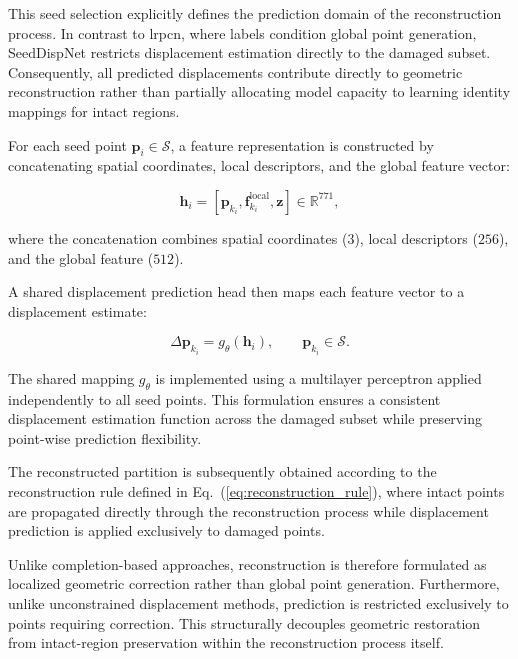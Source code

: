 This seed selection explicitly defines the prediction domain of the reconstruction process. In contrast to \ac{lrpcn}, where labels condition global point generation, SeedDispNet restricts displacement estimation directly to the damaged subset. Consequently, all predicted displacements contribute directly to geometric reconstruction rather than partially allocating model capacity to learning identity mappings for intact regions.

For each seed point $\mathbf{p}_i \in \mathcal{S}$, a feature representation is constructed by concatenating spatial coordinates, local descriptors, and the global feature vector:


\begin{equation}
\mathbf{h}_i =
\left[
\mathbf{p}_{k_i},
\mathbf{f}_{k_i}^{\text{local}},
\mathbf{z}
\right] \in \mathbb{R}^{771},
\end{equation}

\noindent where the concatenation combines spatial coordinates ($3$), local descriptors ($256$), and the global feature ($512$).

A shared displacement prediction head then maps each feature vector to a displacement estimate:

\begin{equation}
\Delta \mathbf{p}_{k_i}
=
g_{\theta}(\mathbf{h}_i),
\qquad
\mathbf{p}_{k_i} \in \mathcal{S}.
\end{equation}

The shared mapping $g_{\theta}$ is implemented using a multilayer perceptron applied independently to all seed points. This formulation ensures a consistent displacement estimation function across the damaged subset while preserving point-wise prediction flexibility.

The reconstructed partition is subsequently obtained according to the reconstruction rule defined in Eq.~(\ref{eq:reconstruction_rule}), where intact points are propagated directly through the reconstruction process while displacement prediction is applied exclusively to damaged points.

Unlike completion-based approaches, reconstruction is therefore formulated as localized geometric correction rather than global point generation. Furthermore, unlike unconstrained displacement methods, prediction is restricted exclusively to points requiring correction. This structurally decouples geometric restoration from intact-region preservation within the reconstruction process itself.

